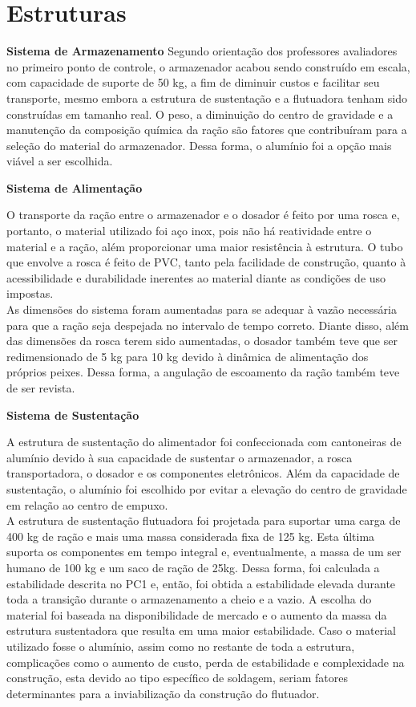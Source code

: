 \section{Estruturas}

\textbf{Sistema de Armazenamento}
\qquad Segundo orientação dos professores avaliadores no primeiro ponto de controle, o armazenador \label{fig:Estrutura_Visao_Geral} acabou sendo construído em escala, com capacidade de suporte de 50 kg, a fim de diminuir custos e facilitar seu transporte, mesmo embora a estrutura de sustentação e a flutuadora tenham sido construídas em tamanho real. O peso, a diminuição do centro de gravidade e a manutenção da composição química da ração são fatores que contribuíram para a seleção do material do armazenador. Dessa forma, o alumínio foi a opção mais viável a ser escolhida.

\textbf{Sistema de Alimentação}

\qquad O transporte da ração entre o armazenador e o dosador é feito por uma  rosca \label{fig:Rosca1}  e, portanto, o material utilizado foi aço inox, pois não há reatividade entre o material e a ração, além proporcionar uma maior resistência à estrutura. O tubo que envolve a rosca é feito de PVC, tanto pela facilidade de construção, quanto à acessibilidade e durabilidade inerentes ao material diante as condições de uso impostas. \\ \qquad As dimensões do sistema foram aumentadas para se adequar à vazão necessária para que a ração seja despejada no intervalo de tempo correto. Diante disso, além das dimensões da rosca terem sido aumentadas, o dosador também teve que ser redimensionado de 5 kg para 10 kg devido à dinâmica de alimentação dos próprios peixes. Dessa forma, a angulação de escoamento da ração também teve de ser revista.


\textbf{Sistema de Sustentação}

\qquad A estrutura de sustentação \label{fig:Estrutura_Visao_Geral} do alimentador foi confeccionada com cantoneiras de alumínio devido à sua capacidade de sustentar o armazenador, a rosca transportadora, o dosador e os componentes eletrônicos. Além da capacidade de sustentação, o alumínio foi escolhido por evitar a elevação do centro de gravidade em relação ao centro de empuxo. \\ \qquad A estrutura de sustentação flutuadora foi projetada para suportar uma carga de 400 kg de ração e  mais uma massa considerada fixa de 125 kg. Esta última suporta os componentes em tempo integral e, eventualmente, a massa de um ser humano de 100 kg e um saco de ração de 25kg. Dessa forma, foi calculada a estabilidade descrita no PC1 e, então, foi obtida a estabilidade elevada durante toda a transição durante o armazenamento a cheio e a vazio. A escolha do material foi baseada na disponibilidade de mercado e o aumento da massa da estrutura sustentadora que resulta em uma maior estabilidade. Caso o material utilizado fosse o alumínio, assim como no restante de toda a estrutura, complicações como o aumento de custo, perda de estabilidade e complexidade na construção, esta devido ao tipo específico de soldagem, seriam fatores determinantes para a inviabilização da construção do flutuador.


